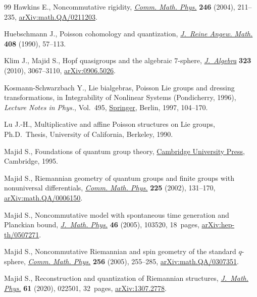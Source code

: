 \documentclass[10pt,a4paper]{amsart}
\numberwithin{equation}{section}
\newcommand{\<}{{\langle}}
\renewcommand{\>}{{\rangle}}
\begin{document}
\begin{thebibliography}{99}
Hawkins E., Noncommutative rigidity, \href{https://doi.org/10.1007/s00220-004-1036-4}{\textit{Comm. Math. Phys.}} \textbf{246}
 (2004), 211--235, \href{https://arxiv.org/abs/math.QA/0211203}{arXiv:math.QA/0211203}.

Huebschmann J., Poisson cohomology and quantization, \href{https://doi.org/10.1515/crll.1990.408.57}{\textit{J.~Reine Angew.
 Math.}} \textbf{408} (1990), 57--113.

Klim J., Majid S., Hopf quasigroups and the algebraic 7-sphere,
 \href{https://doi.org/10.1016/j.jalgebra.2010.03.011}{\textit{J.~Algebra}} \textbf{323} (2010), 3067--3110, \href{https://arxiv.org/abs/0906.5026}{arXiv:0906.5026}.

Kosmann-Schwarzbach Y., Lie bialgebras, {P}oisson {L}ie groups and dressing
 transformations, in Integrability of Nonlinear Systems ({P}ondicherry, 1996),
 \textit{Lecture Notes in Phys.}, Vol.~495, \href{https://doi.org/10.1007/BFb0113695}{Springer}, Berlin, 1997, 104--170.

Lu J.-H., Multiplicative and affine {P}oisson structures on {L}ie groups, Ph.D.~Thesis, {U}niversity of California, Berkeley, 1990.

Majid S., Foundations of quantum group theory, \href{https://doi.org/10.1017/CBO9780511613104}{Cambridge University Press},
 Cambridge, 1995.

Majid S., Riemannian geometry of quantum groups and finite groups with
 nonuniversal differentials, \href{https://doi.org/10.1007/s002201000564}{\textit{Comm. Math. Phys.}} \textbf{225} (2002),
 131--170, \href{https://arxiv.org/abs/math.QA/0006150}{arXiv:math.QA/0006150}.

Majid S., Noncommutative model with spontaneous time generation and {P}lanckian
 bound, \href{https://doi.org/10.1063/1.2084748}{\textit{J.~Math. Phys.}} \textbf{46} (2005), 103520, 18~pages,
 \href{https://arxiv.org/abs/hep-th/0507271}{arXiv:hep-th/0507271}.

Majid S., Noncommutative {R}iemannian and spin geometry of the standard
 {$q$}-sphere, \href{https://doi.org/10.1007/s00220-005-1295-8}{\textit{Comm. Math. Phys.}} \textbf{256} (2005), 255--285,
 \href{https://arxiv.org/abs/math.QA/0307351}{arXiv:math.QA/0307351}.

Majid S., Reconstruction and quantization of {R}iemannian structures,
 \href{https://doi.org/10.1063/1.5123258}{\textit{J.~Math. Phys.}} \textbf{61} (2020), 022501, 32~pages,
 \href{https://arxiv.org/abs/1307.2778}{arXiv:1307.2778}.


\end{thebibliography}
\end{document}
